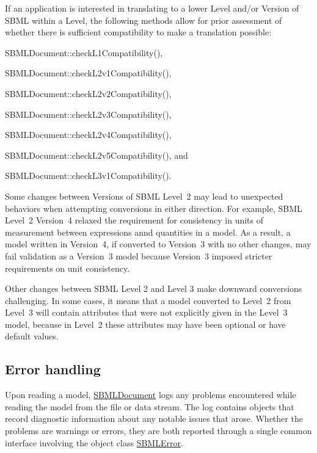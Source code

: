 If an application is interested in translating to a lower Level and/or Version of S\+B\+ML within a Level, the following methods allow for prior assessment of whether there is sufficient compatibility to make a translation possible\+:

\begin{DoxyItemize}
\item S\+B\+M\+L\+Document\+::check\+L1\+Compatibility(), \item S\+B\+M\+L\+Document\+::check\+L2v1\+Compatibility(), \item S\+B\+M\+L\+Document\+::check\+L2v2\+Compatibility(), \item S\+B\+M\+L\+Document\+::check\+L2v3\+Compatibility(), \item S\+B\+M\+L\+Document\+::check\+L2v4\+Compatibility(), \item S\+B\+M\+L\+Document\+::check\+L2v5\+Compatibility(), and \item S\+B\+M\+L\+Document\+::check\+L3v1\+Compatibility().\end{DoxyItemize}
Some changes between Versions of S\+B\+ML Level~2 may lead to unexpected behaviors when attempting conversions in either direction. For example, S\+B\+ML Level~2 Version~4 relaxed the requirement for consistency in units of measurement between expressions annd quantities in a model. As a result, a model written in Version~4, if converted to Version~3 with no other changes, may fail validation as a Version~3 model because Version~3 imposed stricter requirements on unit consistency.

Other changes between S\+B\+ML Level 2 and Level 3 make downward conversions challenging. In some cases, it means that a model converted to Level~2 from Level~3 will contain attributes that were not explicitly given in the Level~3 model, because in Level~2 these attributes may have been optional or have default values.\hypertarget{class_s_b_m_l_document_errors}{}\subsection{Error handling}\label{class_s_b_m_l_document_errors}
Upon reading a model, \hyperlink{class_s_b_m_l_document}{S\+B\+M\+L\+Document} logs any problems encountered while reading the model from the file or data stream. The log contains objects that record diagnostic information about any notable issues that arose. Whether the problems are warnings or errors, they are both reported through a single common interface involving the object class \hyperlink{class_s_b_m_l_error}{S\+B\+M\+L\+Error}.


